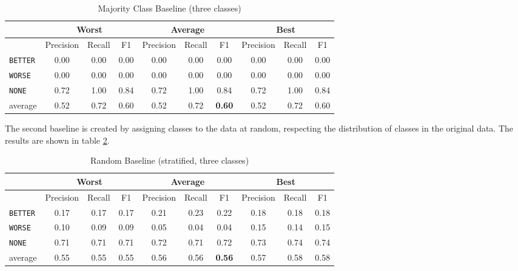     \begin{table}[h]
\centering
\caption{ Majority Class Baseline (three classes)}
\label{tbl:majority_class_baseline}
\begin{tabular}{@{}lccccccccc@{}}
\toprule
      & \multicolumn{3}{c}{Worst} & \multicolumn{3}{c}{Average} & \multicolumn{3}{c}{Best}  \\ \midrule
                 & Precision  & Recall & F1   & Precision  & Recall  & F1    & Precision & Recall & F1   \\ \toprule

    
\texttt{BETTER}	 & 0.00	 & 0.00	 & 0.00	 &0.00	 & 0.00	 & 0.00	 &0.00	 & 0.00	 & 0.00	 \\ 
\texttt{WORSE}	 & 0.00	 & 0.00	 & 0.00	 &0.00	 & 0.00	 & 0.00	 &0.00	 & 0.00	 & 0.00	 \\ 
\texttt{NONE}	 & 0.72	 & 1.00	 & 0.84	 &0.72	 & 1.00	 & 0.84	 &0.72	 & 1.00	 & 0.84	 \\ \midrule 
average	 & 0.52	 & 0.72	 & 0.60	 &0.52	 & 0.72	 & \textbf{0.60}	 &0.52	 & 0.72	 & 0.60	 \\ \bottomrule

    \end{tabular}
\end{table}

The second baseline is created by assigning classes to the data at random, respecting the distribution of classes in the original data. The results are shown in table \ref{tbl:random_baseline}.

 \begin{table}[h]
                \centering
\caption{ Random Baseline (stratified, three classes) }
\label{tbl:random_baseline}
 \begin{tabular}{@{}lccccccccc@{}}
              \toprule
               & \multicolumn{3}{c}{Worst} & \multicolumn{3}{c}{Average} & \multicolumn{3}{c}{Best}  \\ \midrule
               & Precision  & Recall & F1   & Precision  & Recall  & F1    & Precision & Recall & F1   \\ \toprule
\texttt{BETTER}	 & 0.17	 & 0.17	 & 0.17	 &0.21	 & 0.23	 & 0.22	 &0.18	 & 0.18	 & 0.18	 \\ 
\texttt{WORSE}	 & 0.10	 & 0.09	 & 0.09	 &0.05	 & 0.04	 & 0.04	 &0.15	 & 0.14	 & 0.15	 \\ 
\texttt{NONE}	 & 0.71	 & 0.71	 & 0.71	 &0.72	 & 0.71	 & 0.72	 &0.73	 & 0.74	 & 0.74	 \\ \midrule 
average	 & 0.55	 & 0.55	 & 0.55	 &0.56	 & 0.56	 & \textbf{0.56}	 &0.57	 & 0.58	 & 0.58	 \\ \bottomrule

    \end{tabular}
\end{table}

